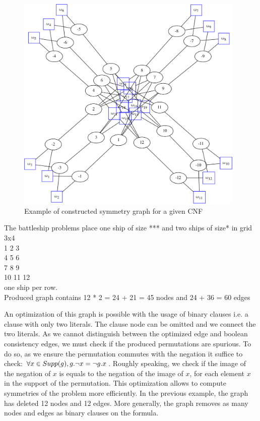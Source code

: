 \begin{figure}[h!]
	\begin{minipage}[c]{.2\textwidth}
		
	\end{minipage}
	\begin{minipage}[l]{.75\textwidth}
		\includegraphics[width=4.3in]{cnfs/graph_cnf_no_opt-crop}
	\end{minipage}
\caption{Example of constructed symmetry graph for a given CNF}
\end{figure}


The battleship problems place one  ship of size *** and two ships of size* in grid 3x4 \\
1  2  3\\
4  5  6\\
7  8  9\\
10 11 12\\

one ship per row.\\

Produced graph contains 12 * 2 = 24  + 21 = 45 nodes and 24 + 36 = 60 edges 

\clearpage

An optimization of this graph is possible with the usage of binary clauses i.e. a clause with only two literals.
The clause node can be omitted and we connect the two literals. As we cannot distinguish between the optimized edge 
and boolean consistency edges, we must check if the produced permutations are spurious. 
To do so, as we ensure the permutation commutes with the negation it suffice to check:
$\forall x \in Supp(g), g.\neg x = \neg g.x$.
Roughly speaking, we check if the image of the negation of $x$ is equals to the negation of the image of $x$, for each element $x$ in the support of the permutation.
This optimization allows to compute symmetries of the problem more efficiently.
In the previous example, the graph has deleted 12 nodes and 12 edges. More generally,
the graph removes as many nodes and edges as binary clauses on the formula.


